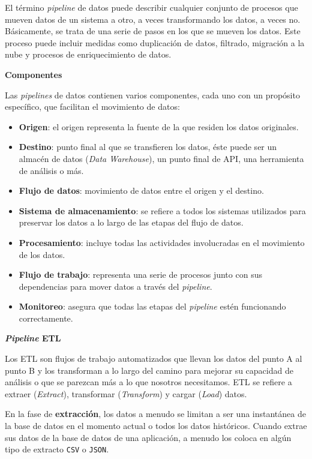 \documentclass[a4paper,12pt]{article}
\begin{document}
		El término \textit{pipeline} de datos puede describir cualquier conjunto de procesos que mueven datos de un sistema a otro, a veces transformando los datos, a veces no. Básicamente, se trata de una serie de pasos en los que se mueven los datos. Este proceso puede incluir medidas como duplicación de datos, filtrado, migración a la nube y procesos de enriquecimiento de datos. \citep{Tobin2020Jun}
						
		\textbf{Componentes}
						
		Las \textit{pipelines} de datos contienen varios componentes, cada uno con un propósito específico, que facilitan el movimiento de datos:
		\begin{itemize}[noitemsep, topsep=2pt]
			\item \textbf{Origen}: el origen representa la fuente de la que residen los datos originales.
			\item \textbf{Destino}: punto final al que se transfieren los datos, éste puede ser un almacén de datos (\textit{Data Warehouse}), un punto final de API, una herramienta de análisis o más.
			\item \textbf{Flujo de datos}: movimiento de datos entre el origen y el destino.
			\item \textbf{Sistema de almacenamiento}: se refiere a todos los sistemas utilizados para preservar los datos a lo largo de las etapas del flujo de datos.
			\item \textbf{Procesamiento}: incluye todas las actividades involucradas en el movimiento de los datos.
			\item \textbf{Flujo de trabajo}: representa una serie de procesos junto con sus dependencias para mover datos a través del \textit{pipeline}.
			\item \textbf{Monitoreo}: asegura que todas las etapas del \textit{pipeline} estén funcionando correctamente.
		\end{itemize}
						
		\textbf{\textit{Pipeline} ETL}
						
		Los ETL son flujos de trabajo automatizados que llevan los datos del punto A al punto B y los transforman a lo largo del camino para mejorar su capacidad de análisis o que se parezcan más a lo que nosotros necesitamos. ETL se refiere a extraer (\textit{Extract}), transformar (\textit{Transform}) y cargar (\textit{Load}) datos. \citep{SeattleDataGuy}
						
		En la fase de \textbf{extracción}, los datos a menudo se limitan a ser una instantánea de la base de datos en el momento actual o todos los datos históricos. Cuando extrae sus datos de la base de datos de una aplicación, a menudo los coloca en algún tipo de extracto \texttt{CSV} o \texttt{JSON}. 
				
\end{document}
